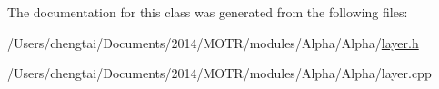 The documentation for this class was generated from the following files\+:\begin{DoxyCompactItemize}
\item 
/\+Users/chengtai/\+Documents/2014/\+M\+O\+T\+R/modules/\+Alpha/\+Alpha/\hyperlink{layer_8h}{layer.\+h}\item 
/\+Users/chengtai/\+Documents/2014/\+M\+O\+T\+R/modules/\+Alpha/\+Alpha/layer.\+cpp\end{DoxyCompactItemize}
